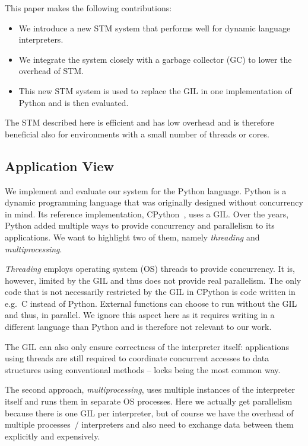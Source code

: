 \documentclass{sigplanconf}
\begin{document}
This paper makes the following contributions:
\begin{itemize}
\item We introduce a new STM system that performs well for dynamic
  language interpreters.
\vspace{3mm}               %
\item We integrate the system closely with a garbage collector
  (GC) to lower the overhead of STM.
\item This new STM system is used to replace the GIL in one
  implementation of Python and is then evaluated.
\end{itemize}

The STM described here is efficient and has low overhead and is
therefore beneficial also for environments with a small number of
threads or cores.

\subsection{Application View}

We implement and evaluate our system for the Python language. Python
is a dynamic programming language that was originally designed without
concurrency in mind.
Its reference implementation, CPython~\cite{cpython}, uses a
GIL. Over the years, Python added multiple ways to provide concurrency and
parallelism to its applications. We want to highlight two of them,
namely \emph{threading} and \emph{multiprocessing}.

\emph{Threading} employs operating system (OS) threads to provide
concurrency. It is, however, limited by the GIL and thus does not
provide real parallelism.
The only code that is not necessarily restricted by the GIL in CPython
is code written in e.g.\ C instead of Python. External functions can
choose to run without the GIL and thus, in parallel. We ignore this
aspect here as it requires writing in a different language than Python
and is therefore not relevant to our work.

The GIL can also
only ensure correctness of the interpreter itself: applications using
threads are still
required to coordinate concurrent accesses to data structures using
conventional methods -- locks being the most common way.

The second approach, \emph{multiprocessing}, uses multiple instances
of the interpreter itself and runs them in separate OS processes.
Here we actually get parallelism because there is one GIL per
interpreter, but of course we have the overhead of multiple processes~/
interpreters and also need to exchange data between them explicitly
and expensively.
\end{document}
